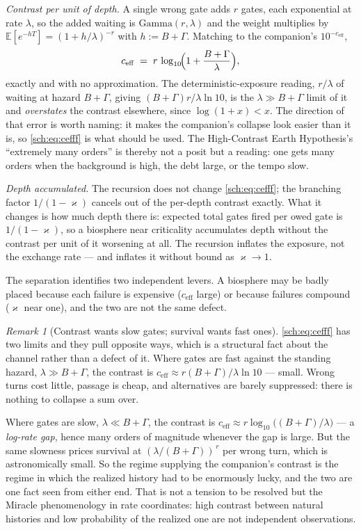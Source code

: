 \documentclass[11pt]{article}
\newcommand{\E}{\mathbb{E}}
\theoremstyle{plain}
\theoremstyle{definition}
\theoremstyle{remark}
\newtheorem{remark}[theorem]{Remark}
\begin{document}
\emph{Contrast per unit of depth.} A single wrong gate adds $r$ gates,
each exponential at rate $\lambda$, so the added waiting is
$\mathrm{Gamma}(r,\lambda)$ and the weight multiplies by
$\E[e^{-hT}]=(1+h/\lambda)^{-r}$ with $h:=B+\Gamma$. Matching to the
companion's $10^{-c_{\mathrm{eff}}}$,
\begin{equation}\label{sch:eq:cefff}
c_{\mathrm{eff}}\;=\;r\,\log_{10}\!\Bigl(1+\frac{B+\Gamma}{\lambda}\Bigr),
\end{equation}
exactly and with no approximation. The deterministic-exposure reading, $r/\lambda$ of waiting at hazard $B+\Gamma$, giving
$(B+\Gamma)r/\lambda\ln10$, is the $\lambda\gg B+\Gamma$ limit of it
and \emph{overstates} the contrast elsewhere, since $\log(1+x)<x$. The
direction of that error is worth naming: it makes the companion's
collapse look easier than it is, so \eqref{sch:eq:cefff} is what should
be used. The High-Contrast Earth
Hypothesis's ``extremely many orders'' is thereby not a posit but a
reading: one gets many orders when the background is high, the debt
large, or the tempo slow.

\emph{Depth accumulated.} The recursion does not change
\eqref{sch:eq:cefff}; the branching factor $1/(1-\varkappa)$ cancels out of the
per-depth contrast exactly. What it changes is how much depth there is:
expected total gates fired per owed gate is $1/(1-\varkappa)$, so a biosphere
near criticality accumulates depth without the contrast per unit of it
worsening at all. The recursion inflates the exposure, not the exchange
rate --- and inflates it without bound as $\varkappa\to1$.

The separation identifies two independent levers. A biosphere may be
badly placed because each failure is expensive ($c_{\mathrm{eff}}$
large) or because failures compound ($\varkappa$ near one), and the two are not
the same defect.

\begin{remark}[Contrast wants slow gates; survival wants fast ones]
\label{sch:rem:tension}
\eqref{sch:eq:cefff} has two limits and they pull opposite ways, which
is a structural fact about the channel rather than a defect of it. Where gates are fast against the standing hazard, $\lambda\gg B+\Gamma$,
the contrast is $c_{\mathrm{eff}}\approx r(B+\Gamma)/\lambda\ln10$ ---
small. Wrong turns cost little, passage is cheap, and alternatives are
barely suppressed: there is nothing to collapse a sum over.

Where gates are slow, $\lambda\ll B+\Gamma$, the contrast is
$c_{\mathrm{eff}}\approx r\log_{10}\bigl((B+\Gamma)/\lambda\bigr)$ --- a
\emph{log-rate gap}, hence many orders of magnitude whenever the gap is
large. But the same slowness prices survival at
$(\lambda/(B+\Gamma))^{\,r}$ per wrong turn, which is astronomically
small. So the regime supplying the companion's contrast is the regime in which
the realized history had to be enormously lucky, and the two are one
fact seen from either end. That is not a tension to be resolved but the
Miracle phenomenology in rate coordinates: high contrast between natural
histories and low probability of the realized one are not independent
observations.
\end{remark}
\end{document}
